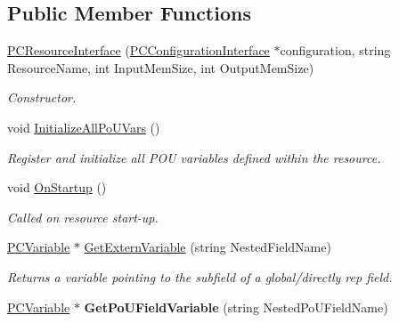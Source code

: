 \subsection*{Public Member Functions}
\begin{DoxyCompactItemize}
\item 
\hyperlink{classpc__emulator_1_1PCResourceInterface_ad9391f2f2b27604587f9cf00eb71cf81}{P\+C\+Resource\+Interface} (\hyperlink{classpc__emulator_1_1PCConfigurationInterface}{P\+C\+Configuration\+Interface} $\ast$configuration, string Resource\+Name, int Input\+Mem\+Size, int Output\+Mem\+Size)
\begin{DoxyCompactList}\small\item\em Constructor. \end{DoxyCompactList}\item 
void \hyperlink{classpc__emulator_1_1PCResourceInterface_a480e635dc710a9ba4990d52659de910d}{Initialize\+All\+Po\+U\+Vars} ()\hypertarget{classpc__emulator_1_1PCResourceInterface_a480e635dc710a9ba4990d52659de910d}{}\label{classpc__emulator_1_1PCResourceInterface_a480e635dc710a9ba4990d52659de910d}

\begin{DoxyCompactList}\small\item\em Register and initialize all P\+OU variables defined within the resource. \end{DoxyCompactList}\item 
void \hyperlink{classpc__emulator_1_1PCResourceInterface_a8212f10176fa3bcdfe27691bdfbe37aa}{On\+Startup} ()\hypertarget{classpc__emulator_1_1PCResourceInterface_a8212f10176fa3bcdfe27691bdfbe37aa}{}\label{classpc__emulator_1_1PCResourceInterface_a8212f10176fa3bcdfe27691bdfbe37aa}

\begin{DoxyCompactList}\small\item\em Called on resource start-\/up. \end{DoxyCompactList}\item 
\hyperlink{classpc__emulator_1_1PCVariable}{P\+C\+Variable} $\ast$ \hyperlink{classpc__emulator_1_1PCResourceInterface_a527cb94c2a258ccd29ce74601d93f9ac}{Get\+Extern\+Variable} (string Nested\+Field\+Name)\hypertarget{classpc__emulator_1_1PCResourceInterface_a527cb94c2a258ccd29ce74601d93f9ac}{}\label{classpc__emulator_1_1PCResourceInterface_a527cb94c2a258ccd29ce74601d93f9ac}

\begin{DoxyCompactList}\small\item\em Returns a variable pointing to the subfield of a global/directly rep field. \end{DoxyCompactList}\item 
\hyperlink{classpc__emulator_1_1PCVariable}{P\+C\+Variable} $\ast$ {\bfseries Get\+Po\+U\+Field\+Variable} (string Nested\+Po\+U\+Field\+Name)\hypertarget{classpc__emulator_1_1PCResourceInterface_a839deede9f3e2dab93716b5780776fc1}{}\label{classpc__emulator_1_1PCResourceInterface_a839deede9f3e2dab93716b5780776fc1}


\end{DoxyCompactItemize}
